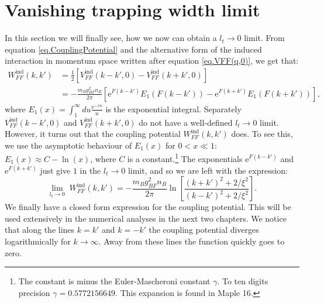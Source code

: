\section{Vanishing trapping width limit}
In this section we will finally see, how we now can obtain a $l_t\to 0$ limit. From equation \eqref{eq.CouplingPotential} and the alternative form of the induced interaction in momentum space written after equation \eqref{eq.VFF(q,0)}, we get that:
\begin{align}
W^\text{ind}_{FF}(k,k') &= \frac{1}{2}\left[V^\text{ind}_{FF}(k-k',0) - V^\text{ind}_{FF}(k+k',0)\right] \nonumber \\
&= -\frac{m_Bg_{BF}^2n_B}{2\pi}\left[ \text{e}^{F(k-k')} E_1(F(k-k')) - \text{e}^{F(k+k')} E_1(F(k+k')) \right], \nonumber
\end{align}
where $E_1(x) = \int_1^\infty du \frac{\text{e}^{-xu}}{u}$ is the exponential integral. Separately $V^\text{ind}_{FF}(k-k',0)$ and $V^\text{ind}_{FF}(k+k',0)$ do not have a well-defined $l_t \to 0$ limit. However, it turns out that the coupling potential $W^\text{ind}_{FF}(k,k')$ does. To see this, we use the asymptotic behaviour of $E_1(x)$ for $0 < x \ll 1$: $E_1(x) \approx C -\ln(x)$, where $C$ is a constant.\footnote{The constant is minus the Euler-Mascheroni constant $\gamma$. To ten digits precision $\gamma = 0.5772156649$. This expansion is found in Maple 16.} The exponentials $\text{e}^{F(k-k')}$ and $\text{e}^{F(k+k')}$ just give $1$ in the $l_t \to 0$ limit, and so we are left with the expression:
\begin{equation}
\lim_{l_t \to 0} \; W^\text{ind}_{FF}(k,k') = -\frac{m_Bg_{BF}^2n_B}{2\pi} \ln\left[\frac{(k+k')^2+2/\xi^2}{(k-k')^2+2/\xi^2}\right].
\label{eq.CouplingPotentiallt=0} 
\end{equation}
We finally have a closed form expression for the coupling potential. This will be used extensively in the numerical analyses in the next two chapters. We notice that along the lines $k = k'$ and $k = -k'$ the coupling potential diverges logarithmically for $k\to \infty$. Away from these lines the function quickly goes to zero.



